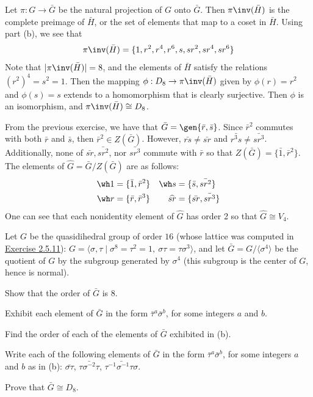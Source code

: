 \begin{solalph}
    Let $\pi : G \to \bar G$ be the natural projection of $G$ onto $\bar G$. Then $\pi\inv(\bar H)$ is the complete preimage of $\bar H$, or the set of elements that map to a coset in $\bar H$. Using part (b), we see that
    \[\pi\inv(\bar H) = \{1, r^2, r^4, r^6, s, sr^2, sr^4, sr^6\}\]
    Note that $|\pi\inv(\bar H)| = 8$, and the elements of $\bar H$ satisfy the relations $(r^2)^4 = s^2 = 1$. Then the mapping $\phi : D_8 \to \pi\inv(\bar H)$ given by $\phi(r) = r^2$ and $\phi(s) = s$ extends to a homomorphism that is clearly surjective. Then $\phi$ is an isomorphism, and $\pi\inv(\bar H) \cong D_8$.
    \item From the previous exercise, we have that $\bar G = \gen{\bar r, \bar s}$. Since $\bar r^2$ commutes with both $\bar r$ and $\bar s$, then $\bar r^2 \in Z(\bar G)$. However, $\bar{rs} \neq \bar{sr}$ and $\bar{r^3s} \neq \bar{sr^3}$. Additionally, none of $\bar{sr}, \bar{sr^2}$, nor $\bar{sr^3}$ commute with $\bar r$ so that $Z(\bar G) = \{\bar 1, \bar r^2\}$. The elements of $\widehat G = \bar G/Z(\bar G)$ are as follows:
    \begin{align*}
        \wh 1 & = \{\bar 1, \bar r^2\} & \wh s & = \{\bar s, \bar{sr^2}\} \\
        \wh r & = \{\bar r, \bar r^3\} & \widehat{sr} & = \{\bar{sr}, \bar{sr^3}\}
    \end{align*}
    One can see that each nonidentity element of $\widehat G$ has order 2 so that $\widehat G \cong V_4$.
\end{solalph}

\begin{exercise}\label{ex3.1.18}
    Let $G$ be the quasidihedral group of order $16$ (whose lattice was computed in \hyperref[ex2.5.11]{Exercise 2.5.11}): $G = \langle \sigma,\tau \mid \sigma^8 = \tau^2 = 1,\ \sigma\tau = \tau\sigma^3 \rangle$, and let $\bar{G} = G/\langle \sigma^4 \rangle$ be the quotient of $G$ by the subgroup generated by $\sigma^4$ (this subgroup is the center of $G$, hence is normal).
    \begin{subproblems}
        \item Show that the order of $\bar{G}$ is $8$.
        \item Exhibit each element of $\bar{G}$ in the form $\bar{\tau}^a \bar{\sigma}^b$, for some integers $a$ and $b$.
        \item Find the order of each of the elements of $\bar{G}$ exhibited in (b).
        \item Write each of the following elements of $\bar{G}$ in the form $\bar{\tau}^a \bar{\sigma}^b$, for some integers $a$ and $b$ as in (b): $\bar{\sigma\tau}$, $\bar{\tau\sigma^{-2}\tau}$, $\bar{\tau^{-1}\sigma^{-1}\tau\sigma}$.
        \item Prove that $\bar{G} \cong D_8$.
    \end{subproblems}
\end{exercise}

